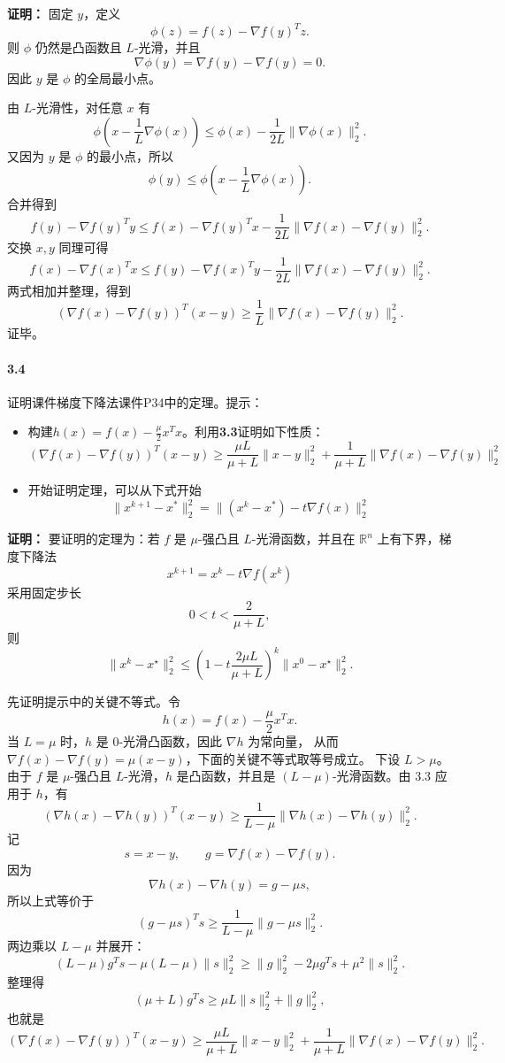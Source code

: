 \documentclass[12pt,a4paper]{article}
\begin{document}
\textbf{证明：}
固定 $y$，定义
\[
  \phi(z)=f(z)-\nabla f(y)^Tz.
\]
则 $\phi$ 仍然是凸函数且 $L$-光滑，并且
\[
  \nabla\phi(y)=\nabla f(y)-\nabla f(y)=0.
\]
因此 $y$ 是 $\phi$ 的全局最小点。

由 $L$-光滑性，对任意 $x$ 有
\[
  \phi\left(x-\frac1L\nabla\phi(x)\right)
  \leq
  \phi(x)-\frac{1}{2L}\|\nabla\phi(x)\|_2^2.
\]
又因为 $y$ 是 $\phi$ 的最小点，所以
\[
  \phi(y)
  \leq
  \phi\left(x-\frac1L\nabla\phi(x)\right).
\]
合并得到
\[
  f(y)-\nabla f(y)^Ty
  \leq
  f(x)-\nabla f(y)^Tx
  -\frac{1}{2L}\|\nabla f(x)-\nabla f(y)\|_2^2.
\]
交换 $x,y$ 同理可得
\[
  f(x)-\nabla f(x)^Tx
  \leq
  f(y)-\nabla f(x)^Ty
  -\frac{1}{2L}\|\nabla f(x)-\nabla f(y)\|_2^2.
\]
两式相加并整理，得到
\[
  \left(\nabla f(x)-\nabla f(y)\right)^T(x-y)
  \geq
  \frac1L\|\nabla f(x)-\nabla f(y)\|_2^2.
\]
证毕。

\paragraph{3.4} 证明课件梯度下降法课件P34中的定理。提示：
\begin{itemize}
	\item[a] 构建$h(x)=f(x)-\frac{\mu}{2}x^Tx$。利用\textbf{3.3}证明如下性质：
    $$(\nabla f(x) -\nabla f(y))^T(x-y) \geq \frac{\mu L}{\mu+L} \|x-y\|_2^2+\frac{1}{\mu+L}\|\nabla f(x) - \nabla f(y)\|^2_2$$
	\item[b] 开始证明定理，可以从下式开始
    $$\|x^{k+1}-x^*\|_2^2=\|(x^k-x^*)-t\nabla f(x)\|_2^2$$
\end{itemize}

\textbf{证明：}
要证明的定理为：若 $f$ 是 $\mu$-强凸且 $L$-光滑函数，并且在
$\mathbb R^n$ 上有下界，梯度下降法
\[
  x^{k+1}=x^k-t\nabla f(x^k)
\]
采用固定步长
\[
  0<t<\frac{2}{\mu+L},
\]
则
\[
  \|x^k-x^\star\|_2^2
  \leq
  \left(1-t\frac{2\mu L}{\mu+L}\right)^k
  \|x^0-x^\star\|_2^2.
\]

先证明提示中的关键不等式。令
\[
  h(x)=f(x)-\frac{\mu}{2}x^Tx.
\]
当 $L=\mu$ 时，$h$ 是 $0$-光滑凸函数，因此 $\nabla h$ 为常向量，
从而 $\nabla f(x)-\nabla f(y)=\mu(x-y)$，下面的关键不等式取等号成立。
下设 $L>\mu$。由于 $f$ 是 $\mu$-强凸且 $L$-光滑，$h$ 是凸函数，并且是 $(L-\mu)$-光滑函数。由 3.3 应用于 $h$，有
\[
  (\nabla h(x)-\nabla h(y))^T(x-y)
  \geq
  \frac{1}{L-\mu}\|\nabla h(x)-\nabla h(y)\|_2^2.
\]
记
\[
  s=x-y,\qquad
  g=\nabla f(x)-\nabla f(y).
\]
因为
\[
  \nabla h(x)-\nabla h(y)=g-\mu s,
\]
所以上式等价于
\[
  (g-\mu s)^Ts
  \geq
  \frac{1}{L-\mu}\|g-\mu s\|_2^2.
\]
两边乘以 $L-\mu$ 并展开：
\[
  (L-\mu)g^Ts-\mu(L-\mu)\|s\|_2^2
  \geq
  \|g\|_2^2-2\mu g^Ts+\mu^2\|s\|_2^2.
\]
整理得
\[
  (\mu+L)g^Ts
  \geq
  \mu L\|s\|_2^2+\|g\|_2^2,
\]
也就是
\[
  (\nabla f(x)-\nabla f(y))^T(x-y)
  \geq
  \frac{\mu L}{\mu+L}\|x-y\|_2^2
  +\frac{1}{\mu+L}
  \|\nabla f(x)-\nabla f(y)\|_2^2.
\]
\end{document}
